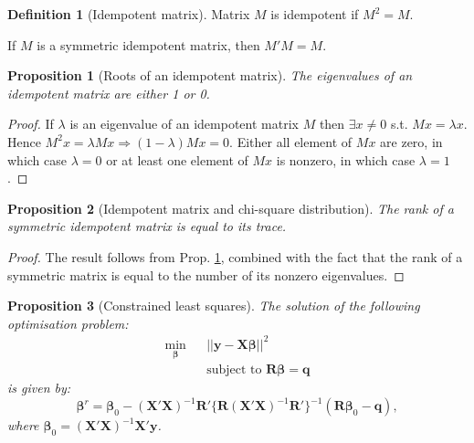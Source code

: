 \documentclass[
  11pt,
]{book}
\newtheorem{proposition}{Proposition}[chapter]
\theoremstyle{definition}
\newtheorem{definition}{Definition}[chapter]
\theoremstyle{definition}
\theoremstyle{definition}
\theoremstyle{definition}
\theoremstyle{remark}
\begin{document}
\begin{definition}[Idempotent matrix]
\protect\hypertarget{def:idempotent}{}\label{def:idempotent}Matrix \(M\) is idempotent if \(M^2=M\).

If \(M\) is a symmetric idempotent matrix, then \(M'M=M\).
\end{definition}

\begin{proposition}[Roots of an idempotent matrix]
\protect\hypertarget{prp:rootsidempotent}{}\label{prp:rootsidempotent}The eigenvalues of an idempotent matrix are either 1 or 0.
\end{proposition}

\begin{proof}
If \(\lambda\) is an eigenvalue of an idempotent matrix \(M\) then \(\exists x \ne 0\) s.t. \(Mx=\lambda x\). Hence \(M^2x=\lambda M x \Rightarrow (1-\lambda)Mx=0\). Either all element of \(Mx\) are zero, in which case \(\lambda=0\) or at least one element of \(Mx\) is nonzero, in which case \(\lambda=1\).
\end{proof}

\begin{proposition}[Idempotent matrix and chi-square distribution]
\protect\hypertarget{prp:chi2idempotent}{}\label{prp:chi2idempotent}The rank of a symmetric idempotent matrix is equal to its trace.
\end{proposition}

\begin{proof}
The result follows from Prop. \ref{prp:rootsidempotent}, combined with the fact that the rank of a symmetric matrix is equal to the number of its nonzero eigenvalues.
\end{proof}

\begin{proposition}[Constrained least squares]
\protect\hypertarget{prp:constrainedLS}{}\label{prp:constrainedLS}The solution of the following optimisation problem:
\begin{eqnarray*}
\underset{\boldsymbol\beta}{\min} && || \mathbf{y} - \mathbf{X}\boldsymbol\beta ||^2 \\
&& \mbox{subject to } \mathbf{R}\boldsymbol\beta = \mathbf{q}
\end{eqnarray*}
is given by:
\[
\boxed{\boldsymbol\beta^r = \boldsymbol\beta_0 - (\mathbf{X}'\mathbf{X})^{-1} \mathbf{R}'\{\mathbf{R}(\mathbf{X}'\mathbf{X})^{-1}\mathbf{R}'\}^{-1}(\mathbf{R}\boldsymbol\beta_0 - \mathbf{q}),}
\]
where \(\boldsymbol\beta_0=(\mathbf{X}'\mathbf{X})^{-1}\mathbf{X}'\mathbf{y}\).
\end{proposition}
\end{document}
